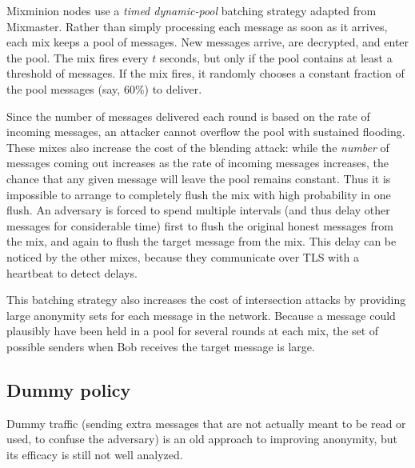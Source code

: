 \documentclass[final]{ieee}
\begin{document}
Mixminion nodes use a \emph{timed dynamic-pool} batching strategy
\cite{trickle02} adapted from Mixmaster. Rather than simply
processing each message as soon as it arrives, each mix keeps a pool of
messages. New messages arrive, are decrypted, and enter the pool. The
mix fires every $t$ seconds, but only if the pool contains at least a
threshold of messages. If the mix fires, it randomly chooses a constant
fraction of the pool messages (say, 60\%) to deliver.

Since the number of messages delivered each round is based on the rate of
incoming messages, an attacker cannot overflow the pool with sustained
flooding. These mixes also increase the cost of the blending attack:
while the \emph{number} of messages coming out increases as the rate
of incoming messages increases, the chance that any given message will
leave the pool remains constant. Thus it is impossible to arrange to
completely flush the mix with high probability in one flush. An adversary
is forced to spend multiple intervals (and thus delay other messages
for considerable time) first to flush the original honest messages from
the mix, and again to flush the target message from the mix. 
This delay
can be noticed by the other mixes, because they communicate over TLS
with a heartbeat to detect delays.


This batching strategy also increases the cost of intersection attacks by
providing large anonymity sets for each message in the network. Because
a message could plausibly have been held in a pool for several rounds
at each mix, the set of possible senders when Bob receives the target
message is large.

\subsection{Dummy policy}

Dummy traffic (sending extra messages that are not actually meant to
be read or used, to confuse the adversary) is an old approach to
improving anonymity, but its efficacy is still not well analyzed.
\end{document}
